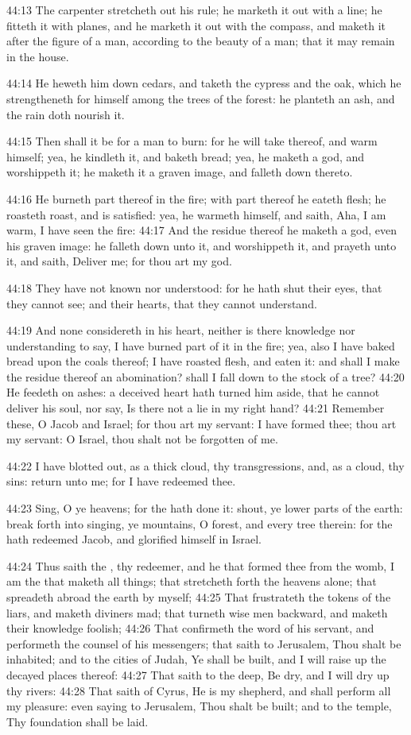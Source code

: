 44:13 The carpenter stretcheth out his rule; he marketh it out with a
line; he fitteth it with planes, and he marketh it out with the
compass, and maketh it after the figure of a man, according to the
beauty of a man; that it may remain in the house.

44:14 He heweth him down cedars, and taketh the cypress and the oak,
which he strengtheneth for himself among the trees of the forest: he
planteth an ash, and the rain doth nourish it.

44:15 Then shall it be for a man to burn: for he will take thereof,
and warm himself; yea, he kindleth it, and baketh bread; yea, he
maketh a god, and worshippeth it; he maketh it a graven image, and
falleth down thereto.

44:16 He burneth part thereof in the fire; with part thereof he eateth
flesh; he roasteth roast, and is satisfied: yea, he warmeth himself,
and saith, Aha, I am warm, I have seen the fire: 44:17 And the residue
thereof he maketh a god, even his graven image: he falleth down unto
it, and worshippeth it, and prayeth unto it, and saith, Deliver me;
for thou art my god.

44:18 They have not known nor understood: for he hath shut their eyes,
that they cannot see; and their hearts, that they cannot understand.

44:19 And none considereth in his heart, neither is there knowledge
nor understanding to say, I have burned part of it in the fire; yea,
also I have baked bread upon the coals thereof; I have roasted flesh,
and eaten it: and shall I make the residue thereof an abomination?
shall I fall down to the stock of a tree?  44:20 He feedeth on ashes:
a deceived heart hath turned him aside, that he cannot deliver his
soul, nor say, Is there not a lie in my right hand?  44:21 Remember
these, O Jacob and Israel; for thou art my servant: I have formed
thee; thou art my servant: O Israel, thou shalt not be forgotten of
me.

44:22 I have blotted out, as a thick cloud, thy transgressions, and,
as a cloud, thy sins: return unto me; for I have redeemed thee.

44:23 Sing, O ye heavens; for the \LORD hath done it: shout, ye lower
parts of the earth: break forth into singing, ye mountains, O forest,
and every tree therein: for the \LORD hath redeemed Jacob, and
glorified himself in Israel.

44:24 Thus saith the \LORD, thy redeemer, and he that formed thee from
the womb, I am the \LORD that maketh all things; that stretcheth forth
the heavens alone; that spreadeth abroad the earth by myself; 44:25
That frustrateth the tokens of the liars, and maketh diviners mad;
that turneth wise men backward, and maketh their knowledge foolish;
44:26 That confirmeth the word of his servant, and performeth the
counsel of his messengers; that saith to Jerusalem, Thou shalt be
inhabited; and to the cities of Judah, Ye shall be built, and I will
raise up the decayed places thereof: 44:27 That saith to the deep, Be
dry, and I will dry up thy rivers: 44:28 That saith of Cyrus, He is my
shepherd, and shall perform all my pleasure: even saying to Jerusalem,
Thou shalt be built; and to the temple, Thy foundation shall be laid.

